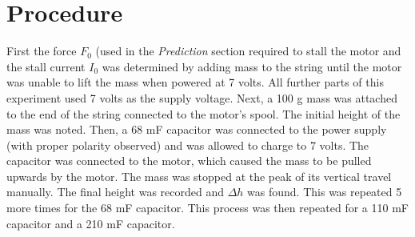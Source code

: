 \documentclass[12pt,letterpaper]{article}
\begin{document}
\section{Procedure}
First the force $F_0$ (used in the \textit{Prediction} section required to stall the motor and the stall current $I_0$ was determined by adding mass to the string until the motor was unable to lift the mass when powered at 7 volts. All further parts of this experiment used 7 volts as the supply voltage. Next, a 100 g mass was attached to the end of the string connected to the motor's spool. The initial height of the mass was noted. Then, a 68 mF capacitor was connected to the power supply (with proper polarity observed) and was allowed to charge to 7 volts. The capacitor was connected to the motor, which caused the mass to be pulled upwards by the motor. The mass was stopped at the peak of its vertical travel manually. The final height was recorded and $\Delta h$ was found. This was repeated 5 more times for the 68 mF capacitor. This process was then repeated for a 110 mF capacitor and a 210 mF capacitor.
\pagebreak
\end{document}

